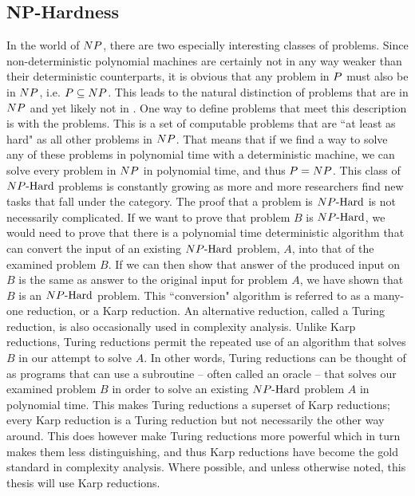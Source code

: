 \subsection{NP-Hardness}
In the world of ${NP}{}$, there are two especially interesting classes of problems. Since non-deterministic polynomial machines are certainly not in any way weaker than their deterministic counterparts, it is obvious that any problem in ${P}{}$ must also be in ${NP}{}$, i.e. ${P} \subseteq {NP}$. This leads to the natural distinction of problems that are in ${NP}{}$ and yet likely not in \pp. One way to define problems that meet this description is with the \textit{\textbf{\nph{}}} problems. This is a set of computable problems that are ``at least as hard" as all other problems in ${NP}{}$. That means that if we find a way to solve any of these problems in polynomial time with a deterministic machine, we can solve every problem in ${NP}{}$ in polynomial time, and thus ${P}{} = {NP}{}$. This class of ${NP\text{-Hard{}}}$ problems is constantly growing as more and more researchers find new tasks that fall under the category. The proof that a problem is ${NP\text{-Hard{}}}$ is not necessarily complicated. If we want to prove that problem $B$ is ${NP\text{-Hard{}}}$, we would need to prove that there is a polynomial time deterministic algorithm that can convert the input of an existing ${NP\text{-Hard{}}}$ problem, $A$, into that of the examined problem $B$. If we can then show that answer of the produced input on $B$ is the same as answer to the original input for problem $A$, we have shown that $B$ is an ${NP\text{-Hard{}}}$ problem. This ``conversion" algorithm is referred to as a many-one reduction, or a Karp reduction. An alternative reduction, called a Turing reduction, is also occasionally used in complexity analysis. Unlike Karp reductions, Turing reductions permit the repeated use of an algorithm that solves $B$ in our attempt to solve $A$. In other words, Turing reductions can be thought of as programs that can use a subroutine -- often called an oracle -- that solves our examined problem $B$ in order to solve an existing ${NP\text{-Hard{}}}$ problem $A$ in polynomial time. This makes Turing reductions a superset of Karp reductions; every Karp reduction is a Turing reduction but not necessarily the other way around. This does however make Turing reductions more powerful which in turn makes them less distinguishing, and thus Karp reductions have become the gold standard in complexity analysis. Where possible, and unless otherwise noted, this thesis will use Karp reductions. 
